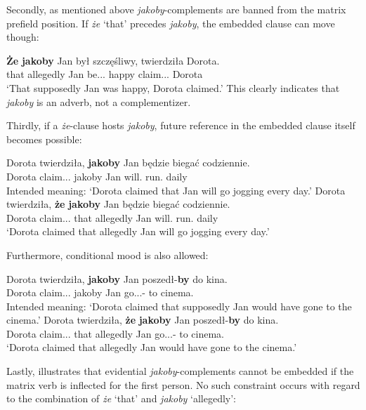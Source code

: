 \documentclass[output=paper
,modfonts
,nonflat]{langsci/langscibook}
\begin{document}
\noindent  Secondly, as mentioned above \emph{jakoby}-complements are banned from the matrix prefield position. If \emph{że} `that' precedes \emph{jakoby}, the embedded clause can move though: 

\ea \gll \textbf{Że} \textbf{jakoby} Jan był szczęśliwy, twierdziła Dorota. \\  
		 that allegedly Jan be.{\lptcp}.{\sg}.{\masc} happy  claim.{\lptcp}.{\sg}.{\fem} Dorota \\
\glt	`That supposedly Jan was happy, Dorota claimed.' 
\z
This clearly indicates that \emph{jakoby} is an adverb, not a complementizer. 

\noindent  Thirdly, if a \emph{że}-clause hosts \emph{jakoby}, future reference in the embedded clause itself becomes possible: 

\ea \ea \gll 	*Dorota twierdziła, \textbf{jakoby} Jan będzie biegać codziennie. \\
		Dorota claim.{\lptcp}.{\sg}.{\fem} jakoby Jan will.{\thirdperson}{\sg} run.{\infv} daily \\
	\glt	Intended meaning: `Dorota claimed that Jan will go jogging every day.'
	\ex\gll	Dorota twierdziła, \textbf{że} \textbf{jakoby} Jan będzie biegać codziennie. \\
		Dorota claim.{\lptcp}.{\sg}.{\fem} that allegedly Jan will.{\thirdperson}{\sg} run.{\infv} daily \\
	\glt	`Dorota claimed that allegedly Jan will go jogging every day.'
\z\z

\noindent  Furthermore, conditional mood is also allowed:

\ea \ea \gll		*Dorota twierdziła, \textbf{jakoby} Jan poszedł-\textbf{by} do kina. \\
 			Dorota claim.{\lptcp}.{\sg}.{\fem} jakoby Jan go.{\lptcp}.{\sg}.{\masc}-{\subj} to cinema.{\gen} \\
	\glt		Intended meaning: `Dorota claimed that supposedly Jan would have gone to the cinema.' 
	\ex\gll		Dorota twierdziła, \textbf{że} \textbf{jakoby} Jan poszedł-\textbf{by} do kina. \\
 			Dorota claim.{\lptcp}.{\sg}.{\fem} that allegedly Jan go.{\lptcp}.{\sg}.{\masc}-{\subj} to cinema.{\gen} \\
	\glt		`Dorota claimed that allegedly Jan would have gone to the cinema.'
\z\z

\noindent  Lastly,  illustrates that evidential \emph{jakoby}-complements cannot be embedded if the matrix verb is inflected for the first person. No such constraint occurs with regard to the combination of \emph{że} `that' and \emph{jakoby} `allegedly': 
\end{document}
